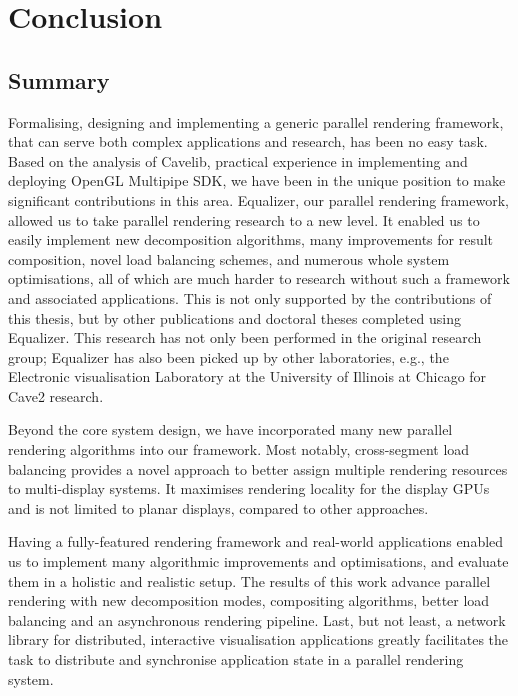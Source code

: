 \chapter{Conclusion}\label{sConclusion}

\section{Summary}

Formalising, designing and implementing a generic parallel rendering framework,
that can serve both complex applications and research, has been no easy task.
Based on the analysis of Cavelib, practical experience in implementing and
deploying OpenGL Multipipe SDK, we have been in the unique position to make
significant contributions in this area. Equalizer, our parallel rendering
framework, allowed us to take parallel rendering research to a new level. It
enabled us to easily implement new decomposition algorithms, many
improvements for result composition, novel load balancing schemes, and numerous
whole system optimisations, all of which are much harder to research without such a
framework and associated applications. This is not only supported by the
contributions of this thesis, but by other publications and doctoral theses
completed using Equalizer. This research has not only been performed in the
original research group; Equalizer has also been picked up by other
laboratories, e.g., the Electronic visualisation Laboratory at the University
of Illinois at Chicago for Cave2 research.

Beyond the core system design, we have incorporated many new parallel rendering
algorithms into our framework. Most notably, cross-segment load balancing
provides a novel approach to better assign multiple rendering resources to
multi-display systems. It maximises rendering locality for the display GPUs and
is not limited to planar displays, compared to other approaches.

Having a fully-featured rendering framework and real-world applications enabled
us to implement many algorithmic improvements and optimisations, and evaluate
them in a holistic and realistic setup. The results of this work advance
parallel rendering with new decomposition modes, compositing algorithms, better
load balancing and an asynchronous rendering pipeline. Last, but not least, a
network library for distributed, interactive visualisation applications greatly
facilitates the task to distribute and synchronise application state in a
parallel rendering system.


